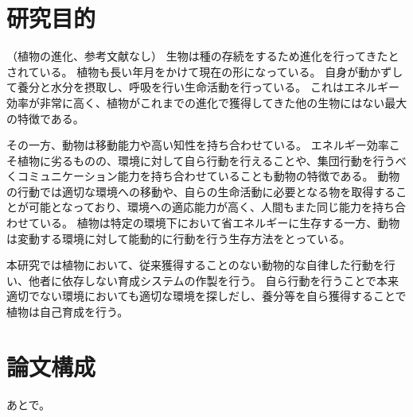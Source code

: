 \section{研究目的}
（植物の進化、参考文献なし）
生物は種の存続をするため進化を行ってきたとされている。
植物も長い年月をかけて現在の形になっている。
自身が動かずして養分と水分を摂取し、呼吸を行い生命活動を行っている。
これはエネルギー効率が非常に高く、植物がこれまでの進化で獲得してきた他の生物にはない最大の特徴である。
\par その一方、動物は移動能力や高い知性を持ち合わせている。
エネルギー効率こそ植物に劣るものの、環境に対して自ら行動を行えることや、集団行動を行うべくコミュニケーション能力を持ち合わせていることも動物の特徴である。
動物の行動では適切な環境への移動や、自らの生命活動に必要となる物を取得することが可能となっており、環境への適応能力が高く、人間もまた同じ能力を持ち合わせている。
植物は特定の環境下において省エネルギーに生存する一方、動物は変動する環境に対して能動的に行動を行う生存方法をとっている。
\par 本研究では植物において、従来獲得することのない動物的な自律した行動を行い、他者に依存しない育成システムの作製を行う。
自ら行動を行うことで本来適切でない環境においても適切な環境を探しだし、養分等を自ら獲得することで植物は自己育成を行う。
\section{論文構成}
あとで。
